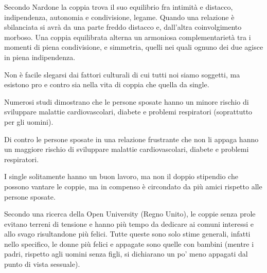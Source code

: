 \documentclass[12pt]{book} %
\begin{document}
Secondo Nardone la coppia trova il suo equilibrio fra intimità e distacco, indipendenza, autonomia e condivisione,
legame. Quando una relazione è sbilanciata si avrà da una parte freddo distacco e, dall'altra
coinvolgimento morboso. Una coppia equilibrata alterna un armoniosa complementarietà tra i momenti di piena
condivisione, e simmetria, quelli nei quali ognuno dei due agisce in piena indipendenza. 


\bigskip
\begin{mdframed}[linewidth=1pt]
Non è facile slegarsi dai fattori culturali di cui tutti noi siamo soggetti, ma esistono pro e contro sia nella vita di
coppia che quella da single. 

Numerosi studi dimostrano che le persone sposate hanno un minore rischio di sviluppare malattie cardiovascolari, diabete
e problemi respiratori (soprattutto per gli uomini).

Di contro le persone sposate in una relazione frustrante che non li appaga hanno un maggiore rischio di sviluppare
malattie cardiovascolari, diabete e problemi respiratori.

I single solitamente hanno un buon lavoro, ma non il doppio stipendio che possono vantare le coppie, ma in compenso è
circondato da più amici rispetto alle persone sposate.

\bigskip

Secondo una ricerca della Open University (Regno
Unito), le coppie senza prole evitano terreni di tensione e hanno più tempo da dedicare ai comuni interessi e allo svago
risultandone più felici. Tutte queste sono solo stime generali, infatti nello specifico, le donne più felici e appagate
sono quelle con bambini (mentre i padri, rispetto agli uomini senza figli, si dichiarano un po' meno appagati dal punto
di vista sessuale).
\end{mdframed}

\bigskip
\end{document}
